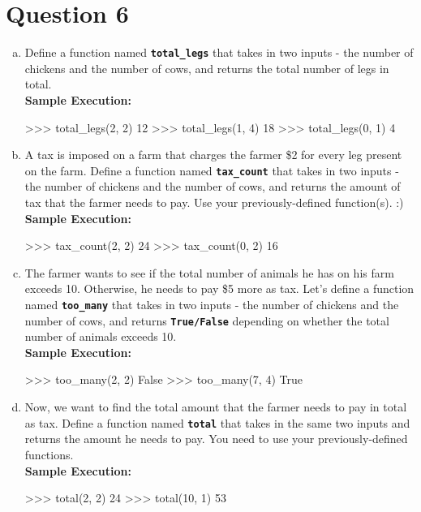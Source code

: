 \section{Question 6}
\begin{enumerate}[(a)]
\item Define a function named \texttt{\bfseries total\_legs} that takes in two inputs - the number of chickens and the number of cows,
and returns the total number of legs in total. \\
\textbf{Sample Execution:}
\begin{python}
>>> total_legs(2, 2)
12
>>> total_legs(1, 4)
18
>>> total_legs(0, 1)
4
\end{python}

\item A tax is imposed on a farm that charges the farmer \$2 for every leg present on the farm. Define a function named
\texttt{\bfseries tax\_count} that takes in two inputs - the number of chickens and the number of cows, and returns the amount of tax that
the farmer needs to pay. Use your previously-defined function(s). :) \\
\textbf{Sample Execution:}
\begin{python}
>>> tax_count(2, 2)
24
>>> tax_count(0, 2)
16
\end{python}
  
\item The farmer wants to see if the total number of animals he has on his farm exceeds 10. Otherwise, he needs to pay \$5
more as tax. Let’s define a function named \texttt{\bfseries too\_many} that takes in two inputs - the number of chickens and the number of cows,
and returns \texttt{\bfseries True/False} depending on whether the total number of animals exceeds 10. \\
\textbf{Sample Execution:}
\begin{python}
>>> too_many(2, 2)
False
>>> too_many(7, 4)
True
\end{python}

\item Now, we want to find the total amount that the farmer needs to pay in total as tax. Define a function named \texttt{\bfseries total}
that takes in the same two inputs and returns the amount he needs to pay. You need to use your previously-defined functions. \\
\textbf{Sample Execution:}
\begin{python}
>>> total(2, 2)
24
>>> total(10, 1)
53
\end{python}
\end{enumerate}

